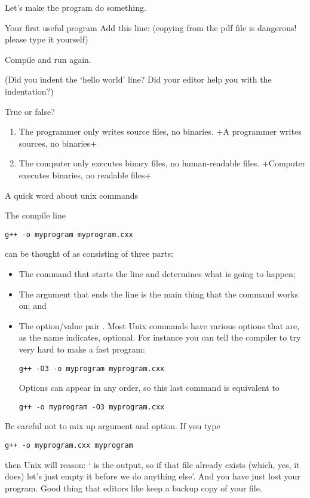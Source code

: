 Let's make the program do something.

\begin{exercise}{Your first useful program}
  \label{ex:sayhello}
Add this line:
%
%
(copying from the pdf file is dangerous! please type it yourself)

Compile and run again.

  (Did you indent the `hello world' line? Did your editor help you with
  the indentation?)
\end{exercise}

\begin{review}
  \label{q:compiler}
  True or false?
  \begin{enumerate}
  \item The programmer only writes source files, no binaries.
    \slackpollTF+A programmer writes sources, no binaries+
  \item The computer only executes binary files, no human-readable files.
    \slackpollTF+Computer executes binaries, no readable files+
  \end{enumerate}
\end{review}

 {A quick word about unix commands}

The compile line
\begin{verbatim}
g++ -o myprogram myprogram.cxx
\end{verbatim}
can be thought of as consisting of three parts:
\begin{itemize}
\item The command  that starts the line and determines what is
  going to happen;
\item The argument  that ends the line is the main
  thing that the command works on; and
\item The option/value pair . Most Unix commands have
  various options that are, as the name indicates, optional. For
  instance you can tell the compiler to try very hard to make a fast program:
\begin{verbatim}
g++ -O3 -o myprogram myprogram.cxx
\end{verbatim}
  Options can appear in any order, so this last command is equivalent to
\begin{verbatim}
g++ -o myprogram -O3 myprogram.cxx
\end{verbatim}
\end{itemize}
Be careful not to mix up argument and option. If you type
\begin{verbatim}
g++ -o myprogram.cxx myprogram
\end{verbatim}
then Unix will reason: ` is the output, so if that
file already exists (which, yes, it does) let's just empty it before
we do anything else'. And you have just lost your program.
Good thing that editors like
 keep a backup copy of your file.

